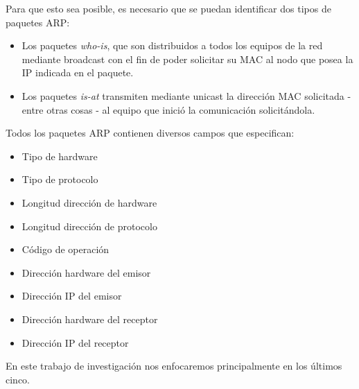 Para que esto sea posible, es necesario que se puedan identificar dos tipos de paquetes ARP: 

\begin{itemize}
    \item Los paquetes \textit{who-is}, que son distribuidos a todos los equipos de la red mediante broadcast con el fin de poder solicitar su MAC al nodo que posea la IP indicada en el paquete.
    \item Los paquetes \textit{is-at} transmiten mediante unicast la dirección MAC solicitada - entre otras cosas - al equipo que inició la comunicación solicitándola.
\end{itemize}

Todos los paquetes ARP contienen diversos campos que especifican:
\begin{itemize}
    \item Tipo de hardware
    \item Tipo de protocolo
    \item Longitud dirección de hardware
    \item Longitud dirección de protocolo
    \item Código de operación
    \item Dirección hardware del emisor
    \item Dirección IP del emisor
    \item Dirección hardware del receptor
    \item Dirección IP del receptor
\end{itemize}

En este trabajo de investigación nos enfocaremos principalmente en los últimos cinco.
